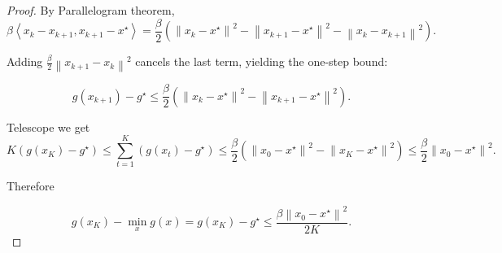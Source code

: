 \documentclass[en,hazy,blue,12pt,normal]{elegantnote}
\begin{document}
\begin{proof}
By Parallelogram theorem,
\[\beta\left\langle x_k-x_{k+1}, x_{k+1}-x^{\star}\right\rangle=\frac{\beta}{2}\left(\left\|x_k-x^{\star}\right\|^2-\left\|x_{k+1}-x^{\star}\right\|^2-\left\|x_k-x_{k+1}\right\|^2\right) .\]

Adding $\frac{\beta}{2}\left\|x_{k+1}-x_k\right\|^2$ cancels the last term, yielding the one-step bound:

$$
g\left(x_{k+1}\right)-g^{\star} \leq \frac{\beta}{2}\left(\left\|x_k-x^{\star}\right\|^2-\left\|x_{k+1}-x^{\star}\right\|^2\right) .
$$

Telescope we get
\[K\left(g\left(x_K\right)-g^{\star}\right) \leq \sum_{t=1}^K\left(g\left(x_t\right)-g^{\star}\right)\le\frac{\beta}{2}\left(\left\|x_0-x^{\star}\right\|^2-\left\|x_K-x^{\star}\right\|^2\right) \leq \frac{\beta}{2}\left\|x_0-x^{\star}\right\|^2 .\]

Therefore

$$
g\left(x_K\right)-\min _x g(x)=g\left(x_K\right)-g^{\star} \leq \frac{\beta\left\|x_0-x^{\star}\right\|^2}{2 K} .
$$
\end{proof}
\end{document}
